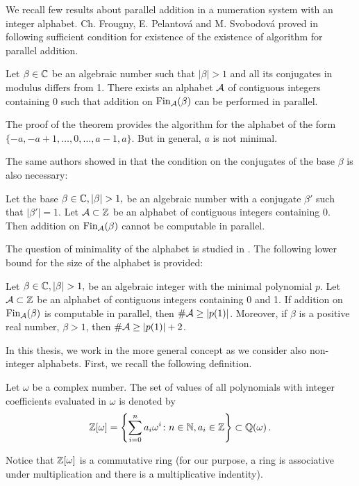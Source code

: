 We recall few results about parallel addition in a numeration system with an integer alphabet. Ch. Frougny, E. Pelantov\'a and M. Svobodov\'a proved in \cite{parAddNS} following sufficient condition for existence of the existence of algorithm for parallel addition.
  \begin{theo}
  Let $\beta\in\mathbb{C}$ be an algebraic number such that $|\beta|>1$ and all its conjugates in modulus differs from 1. There exists an alphabet $\mathcal{A}$ of contiguous integers containing 0 such that addition on $\text{Fin}_{\mathcal{A}}(\beta)$ can be performed in parallel.
  \end{theo}
  The proof of the theorem provides the algorithm for the alphabet of the form $\{-a,-a+1, \dots,0,\dots,a-1,a\}$. But in general, $a$ is not minimal.
    
The same authors showed in \cite{kBlock} that the condition on the conjugates of the base $\beta$ is also necessary:
  \begin{theo}
  Let the base $\beta\in\CC, |\beta|>1,$ be an algebraic number with a conjugate $\beta'$ such that $|\beta'|=1$. Let $\mathcal{A}\subset\mathbb{Z}$ be an alphabet of contiguous integers containing 0. Then addition on $\text{Fin}_{\mathcal{A}}(\beta)$ cannot be computable in parallel.
  \end{theo}
  
The question of minimality of the alphabet is studied in \cite{minAlph}. The following lower bound for the size of the alphabet is provided:
  \begin{theo}
  Let $\beta\in\CC, |\beta|>1,$  be an algebraic integer with the minimal polynomial $p$. Let $\mathcal{A}\subset\mathbb{Z}$ be an alphabet of contiguous integers containing 0 and 1. If addition on $\text{Fin}_{\mathcal{A}}(\beta)$ is computable in parallel, then $\#\mathcal{A} \geq |p(1)|$. Moreover, if $\beta$ is a positive real number, $\beta>1$, then $\#\mathcal{A} \geq  |p(1)|+2$.
  \end{theo}
  

In this thesis, we work in the more general concept as we consider also non-integer alphabets. First, we recall the following definition.
\begin{defn}
Let $\omega$ be a complex number. The set of values of all polynomials with integer coefficients evaluated in $\omega$ is denoted by
$$
    \mathbb{Z}[\omega] =\left\{\sum_{i=0}^n a_i \omega^i\colon n\in\mathbb{N}, a_i\in\mathbb{Z} \right\} \subset \mathbb{Q}(\omega)\,.
$$
\end{defn}
 Notice that $\mathbb{Z}[\omega]$ is a commutative ring (for our purpose, a ring is associative under multiplication and there is a multiplicative indentity).     
    
